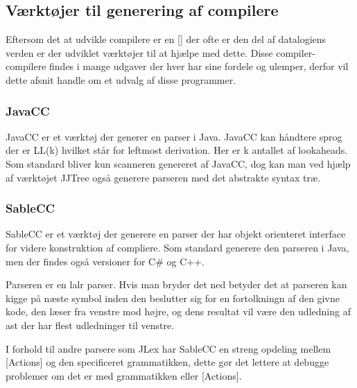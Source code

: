 \subsection{Værktøjer til generering af compilere}
\label{ssec:toolsforcc}

Eftersom det at udvikle compilere er en [] der ofte er den del af datalogiens verden er der udviklet værktøjer til at hjælpe med dette. Disse compiler-compilere findes i mange udgaver der hver har sine fordele og ulemper, derfor vil dette afsnit handle om et udvalg af disse programmer.

\subsubsection{JavaCC}
JavaCC er et værktøj der generer en parser i Java. JavaCC kan håndtere sprog der er LL(k) hvilket står for leftmost derivation. Her er k antallet af lookaheads. Som standard bliver kun scanneren genereret af JavaCC, dog kan man ved hjælp af værktøjet JJTree også generere parseren med det abstrakte syntax træ.

\subsubsection{SableCC}
SableCC er et værktøj der generere en parser der har objekt orienteret interface for videre konstruktion af compliere. Som standard generere den parseren i Java, men der findes også versioner for C\# og C++.
    
    
Parseren er en \gls{lalr} parser. Hvis man bryder det ned betyder det at parseren kan kigge på næste symbol inden den beslutter sig for en fortolkningn af den givne kode, den læser fra venstre mod højre, og dens resultat vil være den udledning af \gls{ast} der har flest udledninger til venstre.
    
I forhold til andre parsere som JLex har SableCC en streng opdeling mellem [Actions] og den specificeret grammatikken, dette gør det lettere at debugge problemer om det er med grammatikken eller [Actions].